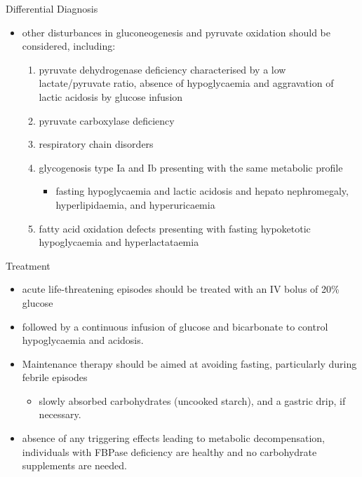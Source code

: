 \documentclass[presentation, smaller]{beamer}
\begin{document}
\begin{frame}[label={sec:org7e6fae7}]{Differential Diagnosis}
\begin{itemize}
\item other disturbances in gluconeogenesis and pyruvate oxidation should be considered, including:
\begin{enumerate}
\item pyruvate dehydrogenase deficiency characterised by a low
lactate/pyruvate ratio, absence of hypoglycaemia and aggravation
of lactic acidosis by glucose infusion
\item pyruvate carboxylase deficiency
\item respiratory chain disorders
\item glycogenosis type Ia and Ib presenting with the same metabolic profile
\begin{itemize}
\item fasting hypoglycaemia and lactic acidosis and hepato nephromegaly, hyperlipidaemia, and hyperuricaemia
\end{itemize}
\item fatty acid oxidation defects presenting with fasting hypoketotic hypoglycaemia and hyperlactataemia
\end{enumerate}
\end{itemize}
\end{frame}

\begin{frame}[label={sec:orgff8a8d1}]{Treatment}
\begin{itemize}
\item acute life-threatening episodes should be treated with an IV bolus
of 20\% glucose
\item followed by a continuous infusion of glucose and bicarbonate to
control hypoglycaemia and acidosis.
\item Maintenance therapy should be aimed at avoiding fasting,
particularly during febrile episodes
\begin{itemize}
\item slowly absorbed carbohydrates (uncooked starch), and a gastric
drip, if necessary.
\end{itemize}
\item absence of any triggering effects leading to metabolic
decompensation, individuals with FBPase deficiency are healthy and
no carbohydrate supplements are needed.
\end{itemize}
\end{frame}
\end{document}
